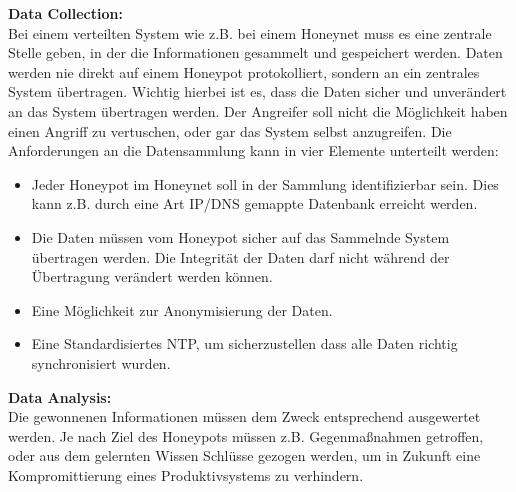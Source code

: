 \noindent\textbf{Data Collection: }\\
\noindent Bei einem verteilten System wie z.B. bei einem Honeynet muss es eine zentrale Stelle geben, in der die Informationen gesammelt und gespeichert werden. Daten werden nie direkt auf einem Honeypot protokolliert, sondern an ein zentrales System übertragen. Wichtig hierbei ist es, dass die Daten sicher und unverändert an das System übertragen werden. Der Angreifer soll nicht die Möglichkeit haben einen Angriff zu vertuschen, oder gar das System selbst anzugreifen\cite{WebHnet.2006b}. Die Anforderungen an die Datensammlung kann in vier Elemente unterteilt werden\cite{spitzner.2002a}:
\begin{itemize}
\item Jeder Honeypot im Honeynet soll in der Sammlung identifizierbar sein. Dies kann z.B. durch eine Art \acf{IP/DNS} gemappte Datenbank erreicht werden.
\item Die Daten müssen vom Honeypot sicher auf das Sammelnde System übertragen werden. Die Integrität der Daten darf nicht während der Übertragung verändert werden können.
\item Eine Möglichkeit zur Anonymisierung der Daten. 
\item Eine Standardisiertes \acf{NTP}, um sicherzustellen dass alle Daten richtig synchronisiert wurden.
\end{itemize}

\noindent\textbf{Data Analysis: }\\
\noindent Die gewonnenen Informationen müssen dem Zweck entsprechend ausgewertet werden. Je nach Ziel des Honeypots müssen z.B. Gegenmaßnahmen getroffen, oder aus dem gelernten Wissen Schlüsse gezogen werden, um in Zukunft eine Kompromittierung eines Produktivsystems zu verhindern\cite{WebHnet.2006b}.
